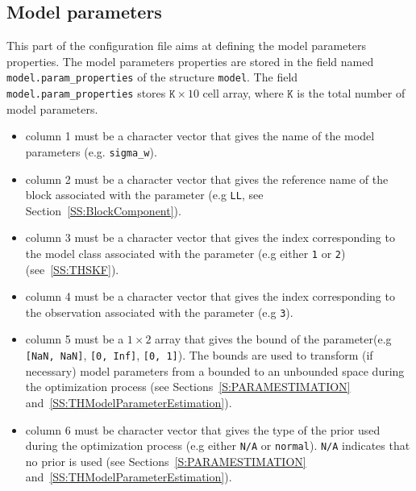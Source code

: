 \subsection{Model parameters}
\label{SS:ModelParamProperties}
This part of the configuration file aims at defining the model parameters properties.
The model parameters properties are stored in the field named \lstinline[basicstyle = \mlttfamily \small ]!model.param_properties! of the \MATLAB{} structure \lstinline[basicstyle = \mlttfamily \small ]!model!.
The field \lstinline[basicstyle = \mlttfamily \small ]!model.param_properties! stores $\mathtt{K} \times 10$ cell array, where $\mathtt{K}$ is the total number of model parameters.
\begin{itemize}
\item column 1 must be a character vector that gives the name of the model parameters (e.g.  \lstinline[basicstyle = \mlttfamily \small ]!sigma_w!). 
\item column 2 must be a character vector that gives the reference name of the block associated with the parameter (e.g \lstinline[basicstyle = \mlttfamily \small ]!LL!, see Section~\ref{SS:BlockComponent}).
\item column 3 must be a character vector that gives the index corresponding to the model class associated with the parameter (e.g  either \lstinline[basicstyle = \mlttfamily \small ]!1! or \lstinline[basicstyle = \mlttfamily \small ]!2!) (see~\ref{SS:THSKF}).
\item column 4 must be a character vector that gives the index corresponding to the observation associated with the parameter (e.g \lstinline[basicstyle = \mlttfamily \small ]!3!).
\item column 5 must be a $1\times2$ array that gives the bound of the parameter(e.g \lstinline[basicstyle = \mlttfamily \small ]![NaN, NaN]!,  \lstinline[basicstyle = \mlttfamily \small ]![0, Inf]!, \lstinline[basicstyle = \mlttfamily \small ]![0, 1]!). 
The bounds are used to transform (if necessary) model parameters from a bounded to  an unbounded space during the optimization process (see Sections~\ref{S:PARAMESTIMATION} and~\ref{SS:THModelParameterEstimation}).
\item column 6 must be character vector that gives the type of the prior used during the optimization process (e.g  either \lstinline[basicstyle = \mlttfamily \small ]!N/A! or \lstinline[basicstyle = \mlttfamily \small ]!normal!). 
\lstinline[basicstyle = \mlttfamily \small ]!N/A! indicates that no prior is used (see Sections~\ref{S:PARAMESTIMATION} and~\ref{SS:THModelParameterEstimation}).

\end{itemize}
